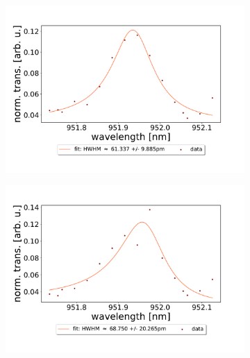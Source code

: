 \begin{figure}[h!]
\begin{subfigure}[b]{0.49\textwidth}
        \includegraphics[width=\textwidth]{figures/results/double fano fits/20250326/21um_M3:M5_fit_9.pdf}
        \caption{}
        \label{fig:21um_M3:M5_fit_9}
    \end{subfigure}
    \begin{subfigure}[b]{0.49\textwidth}
        \includegraphics[width=\textwidth]{figures/results/double fano fits/20250326/21um_M3:M5_fit_10.pdf}
        \caption{}
        \label{fig:21um_M3:M5_fit_10}
    \end{subfigure}
    \begin{subfigure}[b]{0.49\textwidth}

\end{subfigure}
\end{figure}
